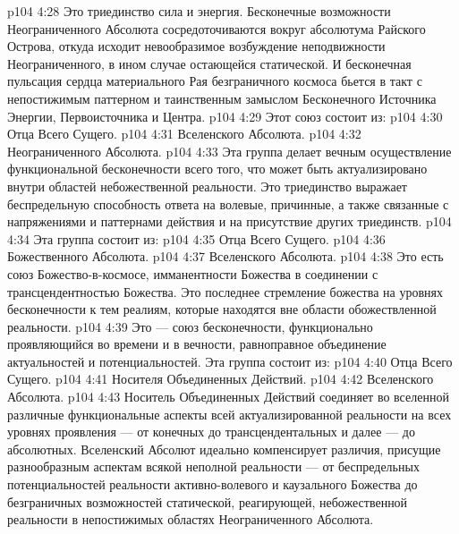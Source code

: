 \vs p104 4:28 Это триединство  сила и энергия. Бесконечные возможности Неограниченного Абсолюта сосредоточиваются вокруг абсолютума Райского Острова, откуда исходит невообразимое возбуждение неподвижности Неограниченного, в ином случае остающейся статической. И бесконечная пульсация сердца материального Рая безграничного космоса бьется в такт с непостижимым паттерном и таинственным замыслом Бесконечного Источника Энергии, Первоисточника и Центра.
\vs p104 4:29 \pc {} Этот союз состоит из:
\vs p104 4:30 \bibnobreakspace Отца Всего Сущего.
\vs p104 4:31 \bibnobreakspace Вселенского Абсолюта.
\vs p104 4:32 \bibnobreakspace Неограниченного Абсолюта.
\vs p104 4:33 \pc Эта группа делает вечным осуществление функциональной бесконечности всего того, что может быть актуализировано внутри областей небожественной реальности. Это триединство выражает беспредельную способность ответа на волевые, причинные, а также связанные с напряжениями и паттернами действия и на присутствие других триединств.
\vs p104 4:34 \pc {} Эта группа состоит из:
\vs p104 4:35 \bibnobreakspace Отца Всего Сущего.
\vs p104 4:36 \bibnobreakspace Божественного Абсолюта.
\vs p104 4:37 \bibnobreakspace Вселенского Абсолюта.
\vs p104 4:38 Это есть союз Божество\hyp{}в\hyp{}космосе, имманентности Божества в соединении с трансцендентностью Божества. Это последнее стремление божества на уровнях бесконечности к тем реалиям, которые находятся вне области обожествленной реальности.
\vs p104 4:39 \pc {} Это --- союз бесконечности, функционально проявляющийся во времени и в вечности, равноправное объединение актуальностей и потенциальностей. Эта группа состоит из:
\vs p104 4:40 \bibnobreakspace Отца Всего Сущего.
\vs p104 4:41 \bibnobreakspace Носителя Объединенных Действий.
\vs p104 4:42 \bibnobreakspace Вселенского Абсолюта.
\vs p104 4:43 \pc Носитель Объединенных Действий соединяет во вселенной различные функциональные аспекты всей актуализированной реальности на всех уровнях проявления --- от конечных до трансцендентальных и далее --- до абсолютных. Вселенский Абсолют идеально компенсирует различия, присущие разнообразным аспектам всякой неполной реальности --- от беспредельных потенциальностей реальности активно\hyp{}волевого и каузального Божества до безграничных возможностей статической, реагирующей, небожественной реальности в непостижимых областях Неограниченного Абсолюта.
